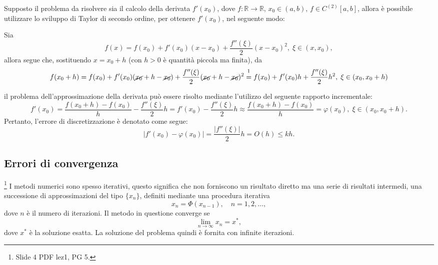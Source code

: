 Supposto il problema da risolvere sia il calcolo della derivata $f'(x_0)$, dove $f:\mathbb R\rightarrow\mathbb R,\, x_0\in (a,b),\, f\in C^{(2)}[a,b]$, allora è possibile utilizzare lo sviluppo di Taylor di secondo ordine, per ottenere $f'(x_0)$, nel seguente modo:

Sia
\begin{equation*}
    f(x)=f(x_0)+f'(x_0)(x-x_0)+\frac{f''(\xi)}{2}(x-x_0)^2,\; \xi\in(x,x_0),
\end{equation*}
allora segue che, sostituendo $x=x_0+h$ (con $h>0$ è quantità piccola ma finita), da
\begin{equation*}
    f(x_0+h)=f(x_0)+f'(x_0)(\cancel{x_0}+h-\cancel{x_0})+\frac{f''(\xi)}{2}(\cancel{x_0}+h-\cancel{x_0})^2\overset{\footnotemark}{=}f(x_0)+f'(x_0)h+\frac{f''(\xi)}{2}h^2,\; \xi\in(x_0,x_0+h)
\end{equation*}


\noindent il problema dell'approssimazione della derivata può essere risolto mediante l'utilizzo del seguente rapporto incrementale:
\begin{equation}\label{eq:approxF'ErrDiscr}
    f'(x_0)=\frac{f(x_0+h)-f(x_0)}{h}-\frac{f''(\xi)}{2}h=f'(x_0)-\frac{f''(\xi)}{2}h\approx\frac{f(x_0+h)-f(x_0)}{h}=\varphi(x_0),\; \xi\in(x_0,x_0+h).
\end{equation}
Pertanto, l'errore di discretizzazione è denotato come segue:
\begin{equation*}
    |f'(x_0)-\varphi(x_0)|=\frac{|f''(\xi)|}{2}h=O(h)\leq kh.
\end{equation*}

\subsection{Errori di convergenza}
\footnote{Slide 4 PDF lez1, PG 5.} I metodi numerici sono spesso iterativi, questo significa che non forniscono un risultato diretto ma una serie di risultati intermedi, una successione di approssimazioni del tipo $\{x_n\}$, definiti mediante una procedura iterativa
\begin{equation}\label{eq:approxProcIterat}
    x_n=\Phi(x_{n-1}),\quad n=1,2,\hdots,
\end{equation}
dove $n$ è il numero di iterazioni. Il metodo in questione converge se
\begin{equation}
    \lim_{n\rightarrow\infty}x_n=x^*,
\end{equation}
dove $x^*$ è la soluzione esatta. La soluzione del problema quindi è fornita con infinite iterazioni.

